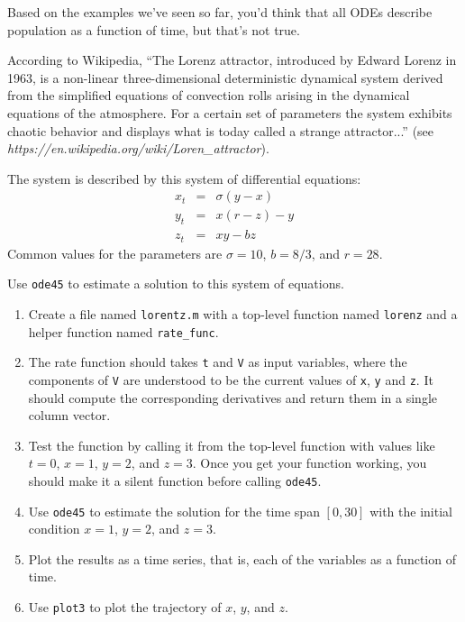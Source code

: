 \begin{ex}


Based on the examples we've seen so far, you'd think that
all ODEs describe population as
a function of time, but that's not true.

According to Wikipedia,
``The Lorenz attractor, introduced by Edward Lorenz in 1963, is a
non-linear three-dimensional deterministic dynamical system derived
from the simplified equations of convection rolls arising in the
dynamical equations of the atmosphere. For a certain set of parameters
the system exhibits chaotic behavior and displays what is today called
a strange attractor...'' (see \emph{https://en.wikipedia.org/wiki/Loren\_attractor}).

The system is described by this system of differential equations:
%
\begin{eqnarray}
x_t &=& \sigma (y - x)  \\
y_t &=& x (r - z) - y   \\
z_t &=& xy - b z
\end{eqnarray}
%
Common values for the parameters are $\sigma = 10$, $b = 8/3$, and $r=28$.

Use {\tt ode45} to estimate a solution to this
system of equations.


\begin{enumerate}

\item Create a file named {\tt lorentz.m} with a top-level function named {\tt lorenz} and a helper function named \verb"rate_func".

\item  The rate function should
takes {\tt t} and {\tt V} as input variables, where the components
of {\tt V} are understood to be the current values of {\tt x},
{\tt y} and {\tt z}.  It should compute the corresponding derivatives
and return them in a single column vector.

\item Test the function by calling it from the top-level function with values like $t=0$, $x=1$, $y=2$, and $z=3$.  Once you get your function working, you should make it a silent function before calling {\tt ode45}.

\item Use {\tt ode45}
to estimate the solution for the time span $[0, 30]$
with the initial condition $x=1$, $y=2$, and $z=3$.

\item Plot the results as a time series, that is, each of the variables as a function of time.

\item Use {\tt plot3} to plot the trajectory of
$x$, $y$, and $z$.

\end{enumerate}

\end{ex}


